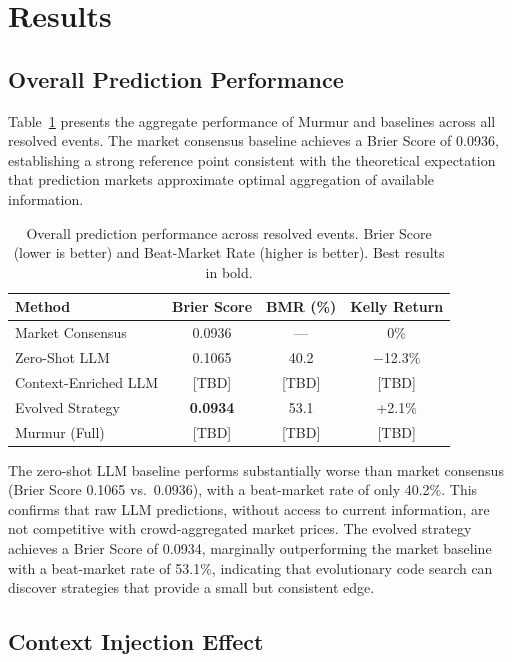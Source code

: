 \section{Results}
\label{sec:results}

\subsection{Overall Prediction Performance}

Table~\ref{tab:main_results} presents the aggregate performance of Murmur and baselines across all resolved events. The market consensus baseline achieves a Brier Score of 0.0936, establishing a strong reference point consistent with the theoretical expectation that prediction markets approximate optimal aggregation of available information.

\begin{table}[t]
\centering
\caption{Overall prediction performance across resolved events. Brier Score (lower is better) and Beat-Market Rate (higher is better). Best results in bold.}
\label{tab:main_results}
\small
\begin{tabular}{@{}lccc@{}}
\toprule
Method & Brier Score & BMR (\%) & Kelly Return \\ \midrule
Market Consensus & 0.0936 & --- & 0\% \\
Zero-Shot LLM & 0.1065 & 40.2 & $-$12.3\% \\
Context-Enriched LLM & [TBD] & [TBD] & [TBD] \\
Evolved Strategy & \textbf{0.0934} & 53.1 & +2.1\% \\
Murmur (Full) & [TBD] & [TBD] & [TBD] \\
\bottomrule
\end{tabular}
\end{table}

The zero-shot LLM baseline performs substantially worse than market consensus (Brier Score 0.1065 vs.\ 0.0936), with a beat-market rate of only 40.2\%. This confirms that raw LLM predictions, without access to current information, are not competitive with crowd-aggregated market prices. The evolved strategy achieves a Brier Score of 0.0934, marginally outperforming the market baseline with a beat-market rate of 53.1\%, indicating that evolutionary code search can discover strategies that provide a small but consistent edge.

\subsection{Context Injection Effect}

